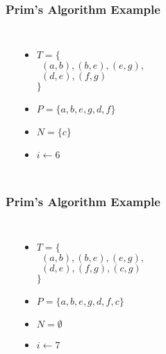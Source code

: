 \documentclass[dvipsnames]{beamer}
\begin{document}
\begin{frame}
  \frametitle{Prim's Algorithm Example}

  \begin{example}[$5 < 7$]
    \begin{columns}
      \begin{center}
      \end{center}

      \pause
      \begin{itemize}
        \item $T = \{$\\
          $~~(a,b), (b,e), (e,g),$\\
          $~~(d,e), (f,g)$\\
          $\}$
        \item $P = \{ a, b, e, g, d, f \}$
        \item $N = \{ c \}$
        \item $i \leftarrow 6$
      \end{itemize}
    \end{columns}
  \end{example}
\end{frame}

\begin{frame}
  \frametitle{Prim's Algorithm Example}

  \begin{example}[$6 < 7$]
    \begin{columns}
      \begin{center}
      \end{center}

      \pause
      \begin{itemize}
        \item $T = \{$\\
          $~~(a,b), (b,e), (e,g),$\\
          $~~(d,e), (f,g), (c,g)$\\
          $\}$
        \item $P = \{ a, b, e, g, d, f, c \}$
        \item $N = \emptyset$
        \item $i \leftarrow 7$
      \end{itemize}
    \end{columns}
  \end{example}
\end{frame}
\end{document}

